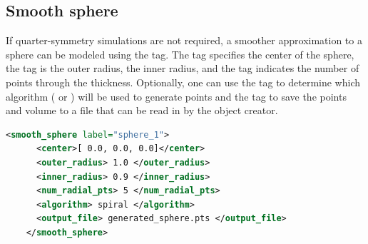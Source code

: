 \subsection{Smooth sphere}
\begin{minipage}[t]{0.6\textwidth}
  \vspace{0pt}
  If quarter-symmetry simulations are not required, a smoother approximation
  to a sphere can be modeled using the  tag. 
  The  tag specifies
  the center of the sphere, the  tag is the outer radius, 
   the inner radius, and the 
   tag indicates the number of points through the
  thickness.  Optionally, one can use the  tag to determine
  which algorithm ( or ) 
  will be used to generate points and the 
  tag to save the points and volume to a file that can be read in by the
   object creator.
  \begin{lstlisting}[language=XML]
    <smooth_sphere label="sphere_1">
      <center>[ 0.0, 0.0, 0.0]</center>
      <outer_radius> 1.0 </outer_radius>
      <inner_radius> 0.9 </inner_radius>
      <num_radial_pts> 5 </num_radial_pts>
      <algorithm> spiral </algorithm>
      <output_file> generated_sphere.pts </output_file>
    </smooth_sphere>
  \end{lstlisting}
\end{minipage}
\hspace{12pt}

